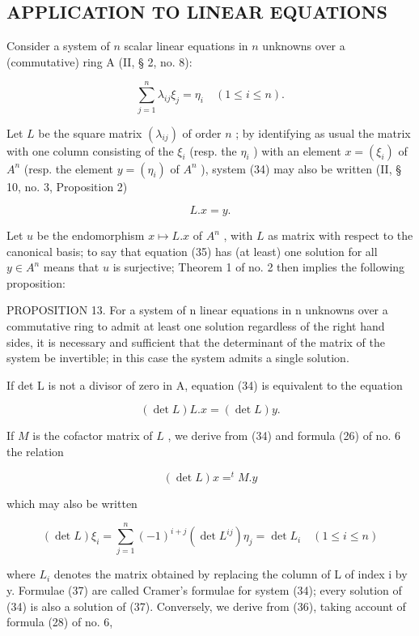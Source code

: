 \subsection{APPLICATION TO LINEAR EQUATIONS}

Consider a system of \(n\) scalar linear equations in \(n\) unknowns over a (commutative) ring A (II, § 2, no. 8):

\[
\sum_ {j = 1} ^ {n} \lambda_ {i j} \xi_ {j} = \eta_ {i} \quad (1 \leqslant i \leqslant n).\tag{34}
\]

Let \(L\) be the square matrix \((\lambda_{ij})\) of order \(n\) ; by identifying as usual the matrix with one column consisting of the \(\xi_i\) (resp. the \(\eta_i\) ) with an element \(x = (\xi_i)\) of \(A^n\) (resp. the element \(y = (\eta_i)\) of \(A^n\) ), system (34) may also be written (II, § 10, no. 3, Proposition 2)

\[
L. x = y.\tag{35}
\]

Let \(u\) be the endomorphism \(x \mapsto L.x\) of \(A^n\) , with \(L\) as matrix with respect to the canonical basis; to say that equation (35) has (at least) one solution for all \(y \in A^n\) means that \(u\) is surjective; Theorem 1 of no. 2 then implies the following proposition:

PROPOSITION 13. For a system of n linear equations in n unknowns over a commutative ring to admit at least one solution regardless of the right hand sides, it is necessary and sufficient that the determinant of the matrix of the system be invertible; in this case the system admits a single solution.

If det L is not a divisor of zero in A, equation (34) is equivalent to the equation

\[
(\det L) L. x = (\det L) y.
\]

If \(M\) is the cofactor matrix of \(L\) , we derive from (34) and formula (26) of no. 6 the relation

\[
(\det L) x = ^ {t} M. y\tag{36}
\]

which may also be written

\[
(\det L) \xi_ {i} = \sum_ {j = 1} ^ {n} (- 1) ^ {i + j} (\det L ^ {i j}) \eta_ {j} = \det L _ {i} \quad (1 \leqslant i \leqslant n)\tag{37}
\]

where \(L_{i}\) denotes the matrix obtained by replacing the column of L of index i by y. Formulae (37) are called Cramer's formulae for system (34); every solution of (34) is also a solution of (37). Conversely, we derive from (36), taking account of formula (28) of no. 6,

